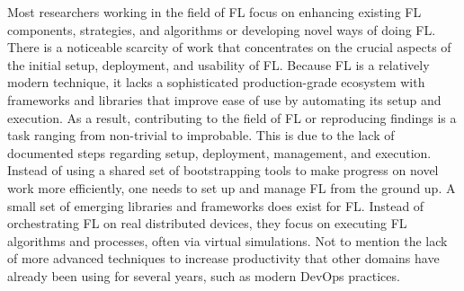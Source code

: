 Most researchers working in the field of FL focus on enhancing existing FL components, strategies, and algorithms or developing novel ways of doing FL.
There is a noticeable scarcity of work that concentrates on the crucial aspects of the initial setup, deployment, and usability of FL.
Because FL is a relatively modern technique, it lacks a sophisticated production-grade ecosystem with frameworks and libraries that improve ease of use by automating its setup and execution.
As a result, contributing to the field of FL or reproducing findings is a task ranging from non-trivial to improbable.
This is due to the lack of documented steps regarding setup, deployment, management, and execution.
Instead of using a shared set of bootstrapping tools to make progress on novel work more efficiently, one needs to set up and manage FL from the ground up.
A small set of emerging libraries and frameworks does exist for FL.
Instead of orchestrating FL on real distributed devices, they focus on executing FL algorithms and processes, often via virtual simulations. 
Not to mention the lack of more advanced techniques to increase productivity that other domains have already been using for several years, such as modern DevOps practices.
